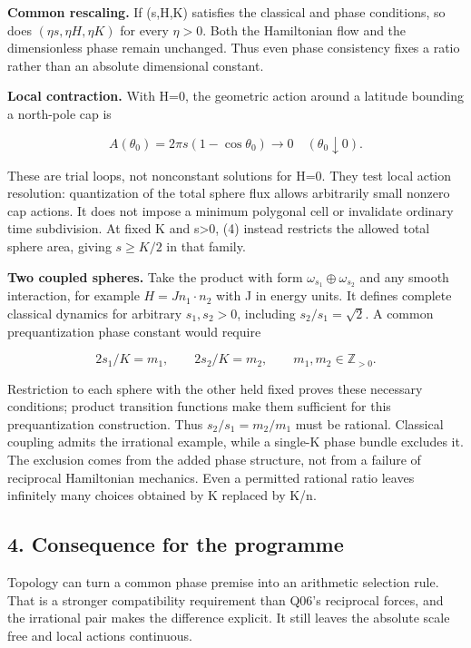 \documentclass[11pt,a4paper]{article}
\begin{document}
\textbf{Common rescaling.} If (s,H,K) satisfies the classical and phase
conditions, so does \((\eta s,\eta H,\eta K)\) for every \(\eta>0\).
Both the Hamiltonian flow and the dimensionless phase remain unchanged.
Thus even phase consistency fixes a ratio rather than an absolute
dimensional constant.

\textbf{Local contraction.} With H=0, the geometric action around a
latitude bounding a north-pole cap is

\[A(\theta_0)=2\pi s(1-\cos\theta_0)\longrightarrow0
\quad(\theta_0\downarrow0). \tag{5}\]

These are trial loops, not nonconstant solutions for H=0. They test
local action resolution: quantization of the total sphere flux allows
arbitrarily small nonzero cap actions. It does not impose a minimum
polygonal cell or invalidate ordinary time subdivision. At fixed K and
s\textgreater0, (4) instead restricts the allowed total sphere area,
giving \(s\ge K/2\) in that family.

\textbf{Two coupled spheres.} Take the product with form
\(\omega_{s_1}\oplus\omega_{s_2}\) and any smooth interaction, for
example \(H=J n_1\cdot n_2\) with J in energy units. It defines complete
classical dynamics for arbitrary \(s_1,s_2>0\), including
\(s_2/s_1=\sqrt2\). A common prequantization phase constant would
require

\[2s_1/K=m_1,\qquad 2s_2/K=m_2,
\qquad m_1,m_2\in\mathbb Z_{>0}. \tag{6}\]

Restriction to each sphere with the other held fixed proves these
necessary conditions; product transition functions make them sufficient
for this prequantization construction. Thus \(s_2/s_1=m_2/m_1\) must be
rational. Classical coupling admits the irrational example, while a
single-K phase bundle excludes it. The exclusion comes from the added
phase structure, not from a failure of reciprocal Hamiltonian mechanics.
Even a permitted rational ratio leaves infinitely many choices obtained
by K replaced by K/n.

\hypertarget{consequence-for-the-programme}{%
\subsection{4. Consequence for the
programme}\label{consequence-for-the-programme}}

Topology can turn a common phase premise into an arithmetic selection
rule. That is a stronger compatibility requirement than Q06's reciprocal
forces, and the irrational pair makes the difference explicit. It still
leaves the absolute scale free and local actions continuous.
\end{document}
